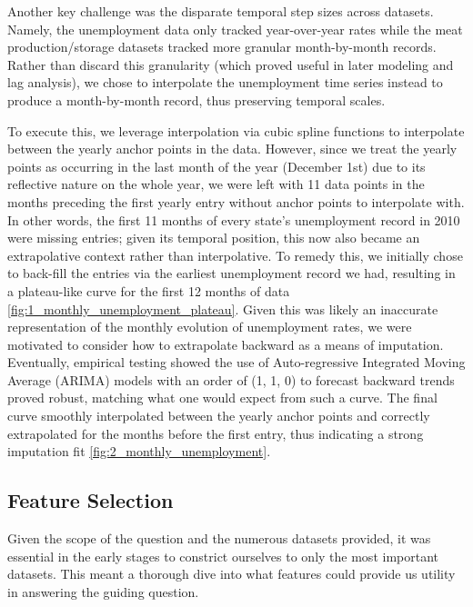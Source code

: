 \documentclass[12pt]{article}
\begin{document}
        Another key challenge was the disparate temporal step sizes across datasets. Namely, the unemployment data only tracked year-over-year rates while the meat production/storage datasets tracked more granular month-by-month records. Rather than discard this granularity (which proved useful in later modeling and lag analysis), we chose to interpolate the unemployment time series instead to produce a month-by-month record, thus preserving temporal scales.
        
        To execute this, we leverage interpolation via cubic spline functions to interpolate between the yearly anchor points in the data. However, since we treat the yearly points as occurring in the last month of the year (December 1st) due to its reflective nature on the whole year, we were left with 11 data points in the months preceding the first yearly entry without anchor points to interpolate with. In other words, the first 11 months of every state's unemployment record in 2010 were missing entries; given its temporal position, this now also became an extrapolative context rather than interpolative. To remedy this, we initially chose to back-fill the entries via the earliest unemployment record we had, resulting in a plateau-like curve for the first 12 months of data \ref{fig:1_monthly_unemployment_plateau}. Given this was likely an inaccurate representation of the monthly evolution of unemployment rates, we were motivated to consider how to extrapolate backward as a means of imputation. Eventually, empirical testing showed the use of Auto-regressive Integrated Moving Average (ARIMA) models with an order of (1, 1, 0) to forecast backward trends proved robust, matching what one would expect from such a curve. The final curve smoothly interpolated between the yearly anchor points and correctly extrapolated for the months before the first entry, thus indicating a strong imputation fit \ref{fig:2_monthly_unemployment}.

    \subsection{Feature Selection}
    Given the scope of the question and the numerous datasets provided, it was essential in the early stages to constrict ourselves to only the most important datasets. This meant a thorough dive into what features could provide us utility in answering the guiding question.
\end{document}
